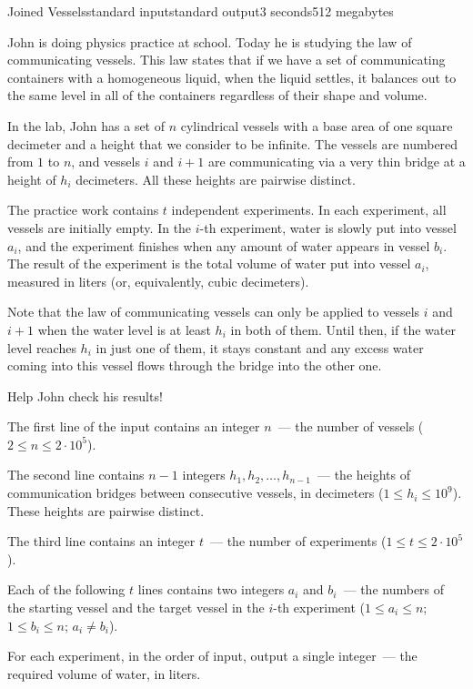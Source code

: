 \begin{problem}{Joined Vessels}{standard input}{standard output}{3 seconds}{512 megabytes}

John is doing physics practice at school. Today he is studying the law of communicating vessels. This law states that if we have a set of communicating containers with a homogeneous liquid, when the liquid settles, it balances out to the same level in all of the containers regardless of their shape and volume.

In the lab, John has a set of $n$ cylindrical vessels with a base area of one square decimeter and a height that we consider to be infinite. The vessels are numbered from $1$ to $n$, and vessels $i$ and $i+1$ are communicating via a very thin bridge at a height of $h_i$ decimeters. All these heights are pairwise distinct.

The practice work contains $t$ independent experiments. In each experiment, all vessels are initially empty. In the $i$-th experiment, water is slowly put into vessel $a_i$, and the experiment finishes when any amount of water appears in vessel $b_i$. 
The result of the experiment is the total volume of water put into vessel $a_i$, measured in liters (or, equivalently, cubic decimeters).

Note that the law of communicating vessels can only be applied to vessels $i$ and $i+1$ when the water level is at least $h_i$ in both of them. Until then, if the water level reaches $h_i$ in just one of them, it stays constant and any excess water coming into this vessel flows through the bridge into the other one.

Help John check his results!

\InputFile
The first line of the input contains an integer $n$~--- the number of vessels ($2 \le n \le 2 \cdot 10^5$). 

The second line contains $n - 1$ integers $h_1, h_2, \dots, h_{n-1}$~--- the heights of communication bridges between consecutive vessels, in decimeters ($1 \le h_i \le 10^9$). These heights are pairwise distinct.

The third line contains an integer $t$~--- the number of experiments ($1 \le t \le 2 \cdot 10^5$).

Each of the following $t$ lines contains two integers $a_i$ and $b_i$~--- the numbers of the starting vessel and the target vessel in the $i$-th experiment ($1 \le a_i \le n$; $1 \le b_i \le n$; $a_i \neq b_i$).

\OutputFile
For each experiment, in the order of input, output a single integer~--- the required volume of water, in liters. 


\end{problem}
